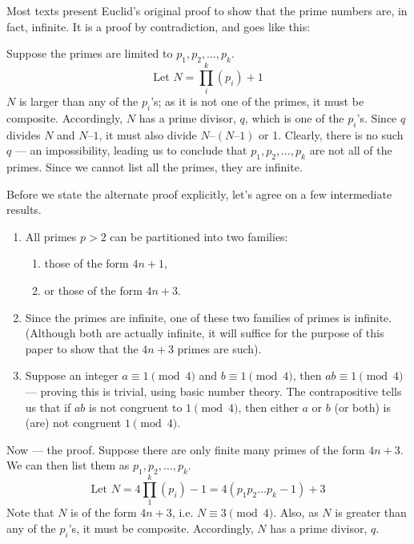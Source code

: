 
Most texts present Euclid’s original proof to show that the prime numbers are, in fact, infinite. It is a proof by contradiction, and goes like this:

Suppose the primes are limited to \(p_1, p_2, \ldots, p_k\).
\[\text{Let } N = \prod_i^k(p_i) + 1\]
\(N\) is larger than any of the \(p_i\)’s; as it is not one of the primes, it must be composite. Accordingly, \(N\) has a prime divisor, \(q\), which is one of the \(p_i\)’s. Since \(q\) divides \(N\) and \(N – 1\), it must also divide \(N – (N – 1)\) or 1. Clearly, there is no such \(q\) --– an impossibility, leading us to conclude that \(p_1, p_2, \ldots, p_k\) are not all of the primes. Since we cannot list all the primes, they are infinite.

Before we state the alternate proof explicitly, let’s agree on a few intermediate results.
\begin{enumerate}
    \item All primes \(p > 2\) can be partitioned into two families:
    \begin{enumerate}
        \item those of the form \(4n + 1\),
        \item or those of the form \(4n + 3\).
    \end{enumerate}
    \item Since the primes are infinite, one of these two families of primes is infinite. (Although both are actually infinite, it will suffice for the purpose of this paper to show that the \(4n + 3\) primes are such).
    \item Suppose an integer \(a \equiv 1 \pmod{4} \) and \(b \equiv 1 \pmod{4} \), then \(ab \equiv 1 \pmod{4} \) --– proving this is trivial, using basic number theory. The contrapositive tells us that if \(ab\) is not congruent to \(1 \pmod{4}\), then either \(a\) or \(b\) (or both) is (are) not congruent \(1 \pmod{4}\).
\end{enumerate} 

Now --- the proof. Suppose there are only finite many primes of the form \(4n + 3\). We can then list them as \(p_1, p_2, \ldots, p_k\).
\[\text{Let } N = 4\prod_1^k(p_i) - 1= 4(p_1p_2\ldots{}p_k - 1) + 3\] Note that \(N\) is of the form \(4n + 3\), i.e. \(N \equiv 3 \pmod{4}\). Also, as \(N\) is greater than any of the \(p_i\)’s, it must be composite. Accordingly, \(N\) has a prime divisor, \(q\).

